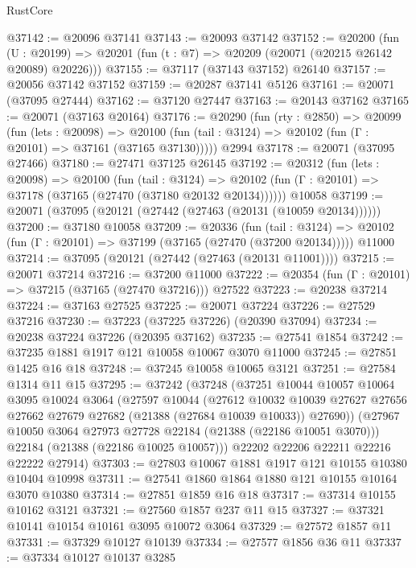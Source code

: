\begin{lexlean}{RustCore}
\begin{coremodule}
@37142 := @20096 @37141
@37143 := @20093 @37142
@37152 := @20200
    (fun (U : @20199) => @20201 (fun (t : @7) => @20209 (@20071 (@20215 @26142 @20089) @20226)))
@37155 := @37117 (@37143 @37152) @26140
@37157 := @20056 @37142 @37152
@37159 := @20287 @37141 @5126
@37161 := @20071 (@37095 @27444)
@37162 := @37120 @27447
@37163 := @20143 @37162
@37165 := @20071 (@37163 @20164)
@37176 := @20290
    (fun (rty : @2850) =>
    @20099
      (fun (lets : @20098) =>
      @20100 (fun (tail : @3124) => @20102 (fun (Γ : @20101) => @37161 (@37165 @37130)))))
    @2994
@37178 := @20071 (@37095 @27466)
@37180 := @27471 @37125 @26145
@37192 := @20312
    (fun (lets : @20098) =>
    @20100
      (fun (tail : @3124) =>
      @20102 (fun (Γ : @20101) => @37178 (@37165 (@27470 (@37180 @20132 @20134))))))
    @10058
@37199 := @20071 (@37095 (@20121 (@27442 (@27463 (@20131 (@10059 @20134))))))
@37200 := @37180 @10058
@37209 := @20336
    (fun (tail : @3124) => @20102 (fun (Γ : @20101) => @37199 (@37165 (@27470 (@37200 @20134)))))
    @11000
@37214 := @37095 (@20121 (@27442 (@27463 (@20131 @11001))))
@37215 := @20071 @37214
@37216 := @37200 @11000
@37222 := @20354 (fun (Γ : @20101) => @37215 (@37165 (@27470 @37216))) @27522
@37223 := @20238 @37214
@37224 := @37163 @27525
@37225 := @20071 @37224
@37226 := @27529 @37216
@37230 := @37223 (@37225 @37226) (@20390 @37094)
@37234 := @20238 @37224 @37226 (@20395 @37162)
@37235 := @27541 @1854
@37242 := @37235 @1881 @1917 @121 @10058 @10067 @3070 @11000
@37245 := @27851 @1425 @16 @18
@37248 := @37245 @10058 @10065 @3121
@37251 := @27584 @1314 @11 @15
@37295 := @37242
    (@37248
      (@37251
        @10044
        @10057
        @10064
        @3095
        @10024
        @3064
        (@27597
          @10044
          (@27612
            @10032
            @10039
            @27627
            @27656
            @27662
            @27679
            @27682
            (@21388 (@27684 @10039 @10033))
            @27690))
        (@27967 @10050 @3064 @27973 @27728 @22184 (@21388 (@22186 @10051 @3070)))
        @22184
        (@21388 (@22186 @10025 @10057)))
      @22202
      @22206
      @22211
      @22216
      @22222
      @27914)
@37303 := @27803 @10067 @1881 @1917 @121 @10155 @10380 @10404 @10998
@37311 := @27541 @1860 @1864 @1880 @121 @10155 @10164 @3070 @10380
@37314 := @27851 @1859 @16 @18
@37317 := @37314 @10155 @10162 @3121
@37321 := @27560 @1857 @237 @11 @15
@37327 := @37321 @10141 @10154 @10161 @3095 @10072 @3064
@37329 := @27572 @1857 @11
@37331 := @37329 @10127 @10139
@37334 := @27577 @1856 @36 @11
@37337 := @37334 @10127 @10137 @3285

\end{coremodule}
\end{lexlean}
